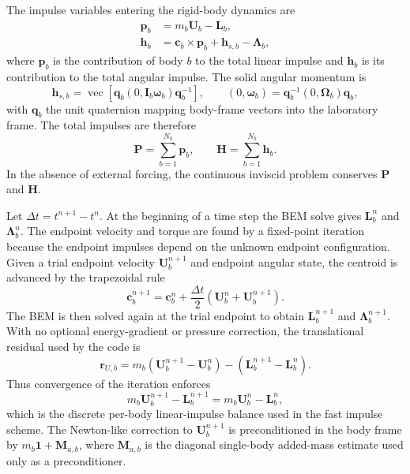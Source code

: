 \documentclass[11pt,a4paper]{article}
\newcommand{\bc}{\bm{c}}
\newcommand{\bU}{\bm{U}}
\newcommand{\bOmega}{\bm{\Omega}}
\newcommand{\bomega}{\bm{\omega}}
\newcommand{\bI}{\bm{I}}
\newcommand{\bL}{\bm{L}}
\newcommand{\bLambda}{\bm{\Lambda}}
\newcommand{\bp}{\bm{p}}
\newcommand{\bh}{\bm{h}}
\newcommand{\bP}{\bm{P}}
\newcommand{\bH}{\bm{H}}
\newcommand{\quat}[1]{\mathbf{#1}}
\DeclareMathOperator{\vecop}{vec}
\begin{document}
The impulse variables entering the rigid-body dynamics are
\begin{align}
  \bp_b
  &=
  m_b\bU_b-\bL_b,
  \label{eq:body-linear-impulse}\\
  \bh_b
  &=
  \bc_b\times\bp_b+\bh_{s,b}-\bLambda_b,
  \label{eq:body-angular-impulse}
\end{align}
where $\bp_b$ is the contribution of body $b$ to the total linear impulse and
$\bh_b$ is its contribution to the total angular impulse.  The solid angular
momentum is
\begin{equation}
  \bh_{s,b}
  =
  \vecop\!\left[
    \quat{q}_b
    \left(0,\bI_b\bomega_b\right)
    \quat{q}_b^{-1}
  \right],
  \qquad
  (0,\bomega_b)=
  \quat{q}_b^{-1}(0,\bOmega_b)\quat{q}_b ,
  \label{eq:solid-angular-impulse}
\end{equation}
with $\quat{q}_b$ the unit quaternion mapping body-frame vectors into the
laboratory frame.  The total impulses are therefore
\begin{equation}
  \bP=\sum_{b=1}^{N_b}\bp_b,\qquad
  \bH=\sum_{b=1}^{N_b}\bh_b .
  \label{eq:total-impulses}
\end{equation}
In the absence of external forcing, the continuous inviscid problem conserves
$\bP$ and $\bH$.

Let $\Delta t=t^{n+1}-t^n$.  At the beginning of a time step the BEM solve gives
$\bL_b^n$ and $\bLambda_b^n$.  The endpoint velocity and torque are found by a
fixed-point iteration because the endpoint impulses depend on the unknown
endpoint configuration.  Given a trial endpoint velocity $\bU_b^{n+1}$ and
endpoint angular state, the centroid is advanced by the trapezoidal rule
\begin{equation}
  \bc_b^{n+1}
  =
  \bc_b^n+
  \frac{\Delta t}{2}
  \left(\bU_b^n+\bU_b^{n+1}\right).
  \label{eq:impulse-position-update}
\end{equation}
The BEM is then solved again at the trial endpoint to obtain
$\bL_b^{n+1}$ and $\bLambda_b^{n+1}$.  With no optional energy-gradient or
pressure correction, the translational residual used by the code is
\begin{equation}
  \bm{r}_{U,b}
  =
  m_b\left(\bU_b^{n+1}-\bU_b^n\right)
  -
  \left(\bL_b^{n+1}-\bL_b^n\right).
  \label{eq:linear-impulse-residual}
\end{equation}
Thus convergence of the iteration enforces
\begin{equation}
  m_b\bU_b^{n+1}-\bL_b^{n+1}
  =
  m_b\bU_b^n-\bL_b^n,
  \label{eq:per-body-linear-impulse}
\end{equation}
which is the discrete per-body linear-impulse balance used in the fast impulse
scheme.  The Newton-like correction to $\bU_b^{n+1}$ is preconditioned in the
body frame by $m_b\mathbf{1}+\mathbf{M}_{a,b}$, where $\mathbf{M}_{a,b}$ is the
diagonal single-body added-mass estimate used only as a preconditioner.
\end{document}
